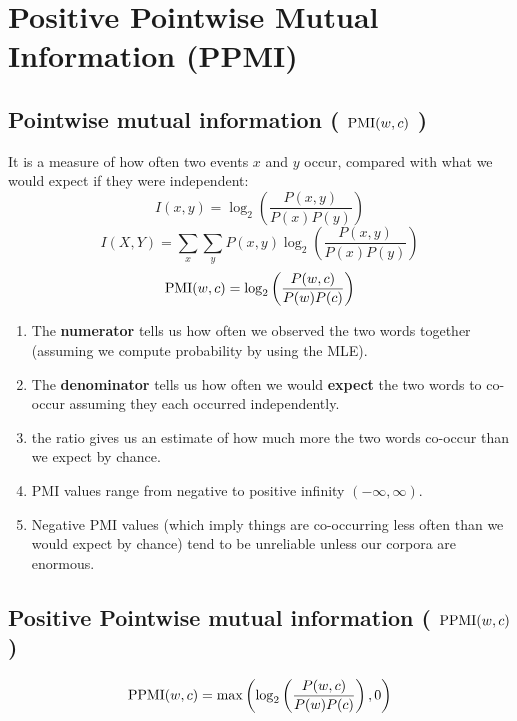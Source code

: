 \chapter{Positive Pointwise Mutual Information (PPMI) \cite{nlp-1}}

\section{Pointwise mutual information ( $\operatorname{PMI}(w,c)$ ) \cite{nlp-1}}
It is a measure of how often two events $x$ and $y$ occur, compared with what we would expect if they were independent:
\[
    I(x,y) = \log_2\left(\displaystyle\dfrac{P(x,y)}{P(x)P(y)}\right)
\]
\[
    \displaystyle I(X,Y) = \sum_x \sum_y P(x,y) \log_2\left(\dfrac{P(x,y)}{P(x)P(y)}\right)
\]
\[
    \operatorname{PMI}(w,c) = \log_2\left(\displaystyle\dfrac{P(w,c)}{P(w)P(c)}\right)
\]

\begin{enumerate}
    \item The \textbf{numerator} tells us how often we observed the two words together (assuming we compute probability by using the MLE).

    \item The \textbf{denominator} tells us how often we would \textbf{expect} the two words to co-occur assuming they each occurred independently.

    \item the ratio gives us an estimate of how much more the two words co-occur than we expect by chance.

    \item PMI values range from negative to positive infinity $(-\infty, \infty)$.

    \item Negative PMI values (which imply things are co-occurring less often than we would expect by chance) tend to be unreliable unless our corpora are enormous.

    
\end{enumerate}


\section{Positive Pointwise mutual information ( $\operatorname{PPMI}(w,c)$ ) \cite{nlp-1}}\label{Positive Pointwise Mutual Information (PPMI)}

\[
    \operatorname{PPMI}(w,c) = \max\left(\log_2\left(\displaystyle\dfrac{P(w,c)}{P(w)P(c)}\right), 0\right)
\]


